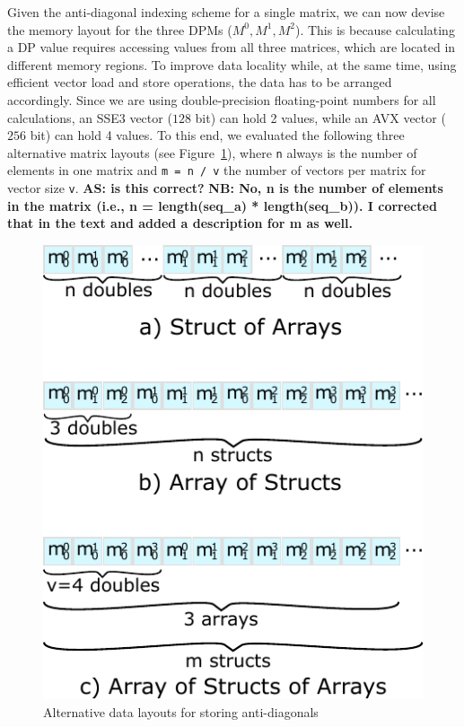 \documentclass[runningheads,a4paper]{llncs}
\begin{document}
Given the anti-diagonal indexing scheme for a single matrix, we can now
devise the memory layout for the three DPMs ($M^0,M^1,M^2$).
This is because calculating a DP value requires
accessing values from all three matrices, which are located in different
memory regions.
To improve data locality while, at the same time, using efficient
vector load and store operations,
the data has to be arranged accordingly.  Since we are using
double-precision floating-point numbers for all calculations, an SSE3 vector
($128$ bit) can hold 2 values, while an AVX vector ($256$ bit) can hold 4 values.
To this end, we evaluated the following three alternative matrix layouts (see Figure~\ref{fig:datalayout}), 
where \verb|n| always is the number of elements in one matrix and \verb|m = n / v| the number of vectors per matrix for vector size \verb|v|.
{\bf AS: is this correct?}
{\bf NB: No, n is the number of elements in the matrix (i.e., n = length(seq\_a) * length(seq\_b)). I corrected that in the text and added a description for m as well.}

\begin{figure}[ht!]
  \centering
  \includegraphics[scale=0.7]{figures/datalayout.pdf}
  \caption{Alternative data layouts for storing anti-diagonals}
  \label{fig:datalayout}
\end{figure}
\end{document}
